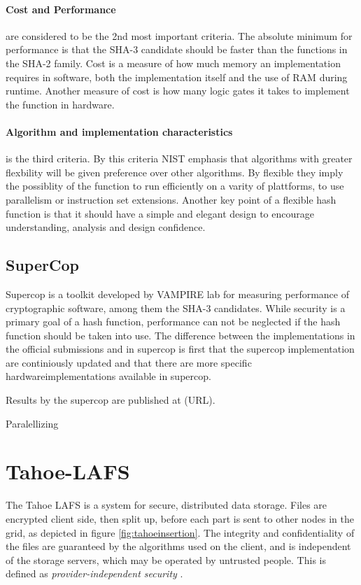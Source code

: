 \documentclass[english,12pt,a4paper]{book}
\begin{document}
\paragraph{Cost and Performance} are considered to be the 2nd most important
criteria. The absolute minimum for performance is that the SHA-3 candidate
should be faster than the functions in the \ac{SHA}-2 family. Cost is a measure
of how much memory an implementation requires in software, both the 
implementation itself and the use of \ac{RAM} during runtime. Another measure
of cost is how many logic gates it takes to implement the function in hardware.

\paragraph{Algorithm and implementation characteristics} is the third criteria.
By this criteria \ac{NIST} emphasis that algorithms with greater flexbility
will be given preference over other algorithms\cite{s_nistround2}. By flexible
they imply the possiblity of the function to run efficiently on a varity of
plattforms, to use parallelism or instruction set extensions. Another key point
of a flexible hash function is that it should have a simple and elegant design
to encourage understanding, analysis and design confidence.

\subsection{SuperCop}
Supercop is a toolkit developed by VAMPIRE lab for measuring performance of
cryptographic software, among them the SHA-3 candidates. While security is a
primary goal of a hash function, performance can not be neglected if the hash
function should be taken into use. The difference between the implementations
in the official submissions and in supercop is first that the supercop
implementation are continiously updated and that there are more specific
hardwareimplementations available in supercop.

Results by the supercop are published at (URL).


Paralellizing

\section{Tahoe-LAFS}

The Tahoe \ac{LAFS} is a system for secure,
distributed data storage. Files are encrypted client side, then
split up, before each part is sent to other nodes in the grid, as depicted in
figure \ref{fig:tahoeinsertion}. The integrity and confidentiality of the files
are guaranteed by the algorithms used on the client, and is independent of the
storage servers, which may be operated by untrusted people. This is defined as
\emph{provider-independent security} \cite{t_tahoe}.
\end{document}
